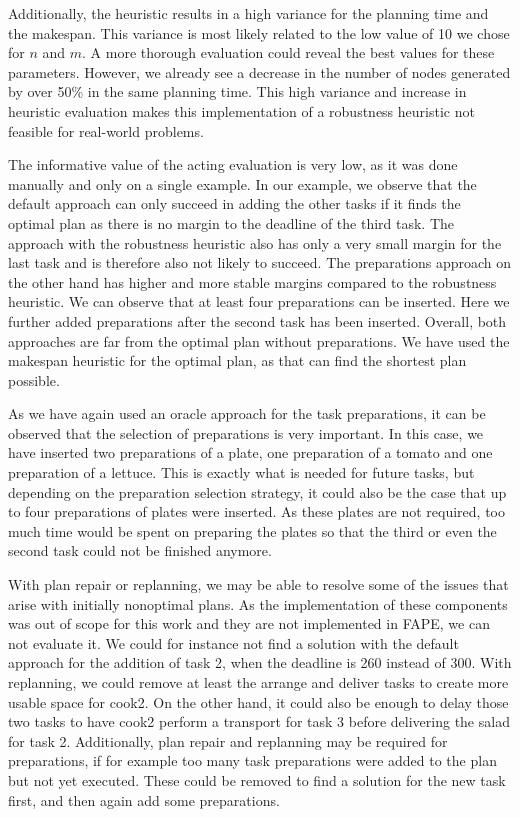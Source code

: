 Additionally, the heuristic results in a high variance for the planning time and the makespan.
This variance is most likely related to the low value of 10 we chose for $n$ and $m$.
A more thorough evaluation could reveal the best values for these parameters.
However, we already see a decrease in the number of nodes generated by over 50\% in the same planning time.
This high variance and increase in heuristic evaluation makes this implementation of a robustness heuristic not feasible for real-world problems.

The informative value of the acting evaluation is very low, as it was done manually and only on a single example.
In our example, we observe that the default approach can only succeed in adding the other tasks if it finds the optimal plan as there is no margin to the deadline of the third task.
The approach with the robustness heuristic also has only a very small margin for the last task and is therefore also not likely to succeed.
The preparations approach on the other hand has higher and more stable margins compared to the robustness heuristic.
We can observe that at least four preparations can be inserted.
Here we further added preparations after the second task has been inserted.
Overall, both approaches are far from the optimal plan without preparations.
We have used the makespan heuristic for the optimal plan, as that can find the shortest plan possible.

As we have again used an oracle approach for the task preparations, it can be observed that the selection of preparations is very important.
In this case, we have inserted two preparations of a plate, one preparation of a tomato and one preparation of a lettuce.
This is exactly what is needed for future tasks, but depending on the preparation selection strategy, it could also be the case that up to four preparations of plates were inserted.
As these plates are not required, too much time would be spent on preparing the plates so that the third or even the second task could not be finished anymore.

With plan repair or replanning, we may be able to resolve some of the issues that arise with initially nonoptimal plans.
As the implementation of these components was out of scope for this work and they are not implemented in FAPE, we can not evaluate it.
We could for instance not find a solution with the default approach for the addition of task 2, when the deadline is 260 instead of 300.
With replanning, we could remove at least the arrange and deliver tasks to create more usable space for cook2.
On the other hand, it could also be enough to delay those two tasks to have cook2 perform a transport for task 3 before delivering the salad for task 2.
Additionally, plan repair and replanning may be required for preparations, if for example too many task preparations were added to the plan but not yet executed.
These could be removed to find a solution for the new task first, and then again add some preparations.


